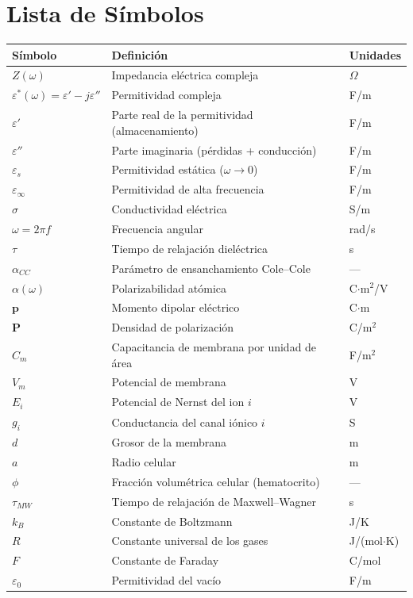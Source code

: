 \documentclass[12pt]{article}
\begin{document}
\section*{Lista de S\'imbolos}
\begin{center}
\renewcommand{\arraystretch}{1.4}
\begin{tabular}{@{}lll@{}}
\toprule
\textbf{S\'imbolo} & \textbf{Definici\'on} & \textbf{Unidades} \\
\midrule
$Z(\omega)$ & Impedancia el\'ectrica compleja & $\Omega$ \\
$\varepsilon^*(\omega) = \varepsilon' - j\varepsilon''$ & Permitividad compleja & F/m \\
$\varepsilon'$ & Parte real de la permitividad (almacenamiento) & F/m \\
$\varepsilon''$ & Parte imaginaria (p\'erdidas + conducci\'on) & F/m \\
$\varepsilon_s$ & Permitividad est\'atica ($\omega\to 0$) & F/m \\
$\varepsilon_\infty$ & Permitividad de alta frecuencia & F/m \\
$\sigma$ & Conductividad el\'ectrica & S/m \\
$\omega = 2\pi f$ & Frecuencia angular & rad/s \\
$\tau$ & Tiempo de relajaci\'on diel\'ectrica & s \\

$\alpha_{CC}$ & Par\'ametro de ensanchamiento Cole--Cole & --- \\
$\alpha(\omega)$ & Polarizabilidad at\'omica & C$\cdot$m$^2$/V \\
$\mathbf{p}$ & Momento dipolar el\'ectrico & C$\cdot$m \\
$\mathbf{P}$ & Densidad de polarizaci\'on & C/m$^2$ \\
$C_m$ & Capacitancia de membrana por unidad de \'area & F/m$^2$ \\
$V_m$ & Potencial de membrana & V \\
$E_i$ & Potencial de Nernst del ion $i$ & V \\
$g_i$ & Conductancia del canal i\'onico $i$ & S \\
$d$ & Grosor de la membrana & m \\
$a$ & Radio celular & m \\
$\phi$ & Fracci\'on volum\'etrica celular (hematocrito) & --- \\
$\tau_{MW}$ & Tiempo de relajaci\'on de Maxwell--Wagner & s \\
$k_B$ & Constante de Boltzmann & J/K \\
$R$ & Constante universal de los gases & J/(mol$\cdot$K) \\
$F$ & Constante de Faraday & C/mol \\
$\varepsilon_0$ & Permitividad del vac\'io & F/m \\
\bottomrule
\end{tabular}
\end{center}
\newpage
\end{document}
